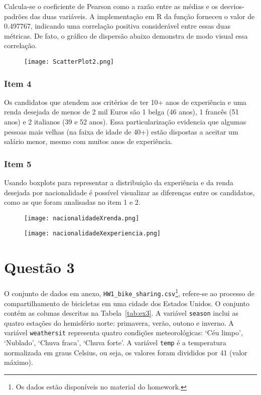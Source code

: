 \documentclass[a4paper,11pt]{article}
\begin{document}
Calcula-se o coeficiente de Pearson como a razão entre as médias e os desvios-padrões das duas variáveis. A implementação em R da função forneceu o valor de 0.497767, indicando uma correlação positiva considerável entre essas duas métricas. De fato, o gráfico de dispersão abaixo demonstra de modo visual essa correlação.

\begin{figure}[h]
    \centering
    \texttt{[image: ScatterPlot2.png]}
\end{figure}

\subsubsection{Item 4}
Os candidatos que atendem aos critérios de ter 10+ anos de experiência e uma renda desejada de menos de 2 mil Euros são 1 belga (46 anos), 1 francês (51 anos) e 2 italianos (39 e 52 anos). Essa particularização evidencia que algumas pessoas mais velhas (na faixa de idade de 40+) estão dispostas a aceitar um salário menor, mesmo com muitos anos de experiência.

\subsubsection{Item 5}

Usando boxplots para representar a distribuição da experiência e da renda desejada por nacionalidade é possível visualizar as diferenças entre os candidatos, como as que foram analisadas no item 1 e 2.

\begin{figure}[h]
    \centering
    \texttt{[image: nacionalidadeXrenda.png]}
\end{figure}

\begin{figure}[h]
    \centering
    \texttt{[image: nacionalidadeXexperiencia.png]}
\end{figure}

\newpage

\section{\textbf{Questão 3}}

O conjunto de dados em anexo, {\tt HW1\_bike\_sharing.csv}\footnote{\label{refnote}Os dados estão disponíveis no material do homework.}, refere-se ao processo de compartilhamento de bicicletas em uma cidade dos Estados Unidos. O conjunto contém as colunas descritas na Tabela~\ref{tab:ex3}. A variável {\tt season} inclui as quatro estações do hemisfério norte: primavera, verão, outono e inverno. A variável {\tt weathersit} representa quatro condições meteorológicas: `Céu limpo', `Nublado', `Chuva fraca', `Chuva forte'. A variável {\tt temp} é a temperatura normalizada em graus Celsius, ou seja, os valores foram divididos por 41 (valor máximo).
\end{document}

